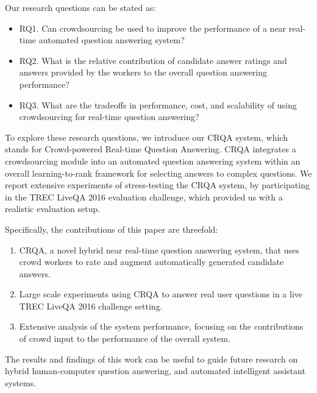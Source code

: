 Our research questions can be stated as:
\begin{itemize}
\item RQ1. Can crowdsourcing be used to improve the performance of a near real-time automated question answering system?
\item RQ2. What is the relative contribution of candidate answer ratings and answers provided by the workers to the overall question answering performance?
\item RQ3. What are the tradeoffs in performance, cost, and scalability of using crowdsourcing for real-time question answering?
\end{itemize}

To explore these research questions, we introduce our CRQA system, which stands for Crowd-powered Real-time Question Answering.
CRQA integrates a crowdsourcing module into an automated question answering system within an overall learning-to-rank framework for selecting answers to complex questions. We report extensive experiments of stress-testing the CRQA system, by participating in the TREC LiveQA 2016 evaluation challenge, which provided us with a realistic evaluation setup.

Specifically, the contributions of this paper are threefold:
\begin{enumerate}
\item CRQA, a novel hybrid near real-time question answering system, that uses crowd workers to rate and augment automatically generated candidate answers.
\item Large scale experiments using CRQA to answer real user questions in a live TREC LiveQA 2016 challenge setting.
\item Extensive analysis of the system performance, focusing on the contributions of crowd input to the performance of the overall system.
\end{enumerate}

The results and findings of this work can be useful to guide future research on hybrid human-computer question answering, and automated intelligent assistant systems.
